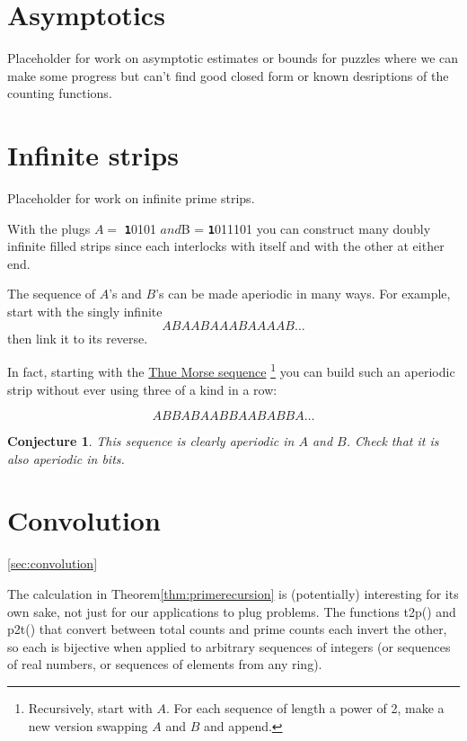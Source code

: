 \documentclass[10pt]{article}
\newtheorem{conjecture}[theorem]{Conjecture}
\numberwithin{equation}{section}
\newenvironment{anote}
               {{\textcolor{blue}{Note:}}
                 \itshape
               }
               {}
\newcommand{\plug}[1]{%
\mbox{{\textbf\texttt #1}}
}
\begin{document}
\section{Asymptotics}

\begin{anote}
Placeholder for work on asymptotic estimates or bounds for puzzles where we can make some progress but can't find  good closed form or known desriptions of the counting functions.
\end{anote}

\section{Infinite strips}

\begin{anote}
Placeholder for work on infinite prime strips.
\end{anote}

With the plugs $A = $\plug{10101}$ and $B = \plug{1011101} you can construct many doubly infinite filled strips since each interlocks with itself and with the other at either end. 

The sequence of $A$'s and $B$'s can be made aperiodic in many ways. For example, start with the singly infinite
\begin{equation}
    ABAABAAABAAAAB\ldots
\end{equation}
then link it to its reverse.

In fact, starting with the \href{https://en.wikipedia.org/wiki/Thue-Morse_sequence}{Thue Morse sequence}
\footnote{ Recursively, start with $A$. For each sequence of length a power of 2, make a new version swapping $A$ and $B$ and append.}
you can build such an aperiodic strip without ever using three of a kind in a row:  

\begin{equation*}
  A B  BA BAAB BAABABBA \ldots  
\end{equation*}

\begin{conjecture}
This sequence is clearly aperiodic in $A$ and $B$. Check that it is also aperiodic in bits.
\end{conjecture}
\section{Convolution}\ref{sec:convolution}

The calculation in Theorem\ref{thm:primerecursion} is (potentially) interesting for its own sake, not just for our applications to plug problems. The functions t2p() and p2t() that convert between total counts and prime counts each invert the other, so each is bijective when applied to arbitrary sequences of integers (or sequences of real numbers, or sequences of elements from any ring).
\end{document}
